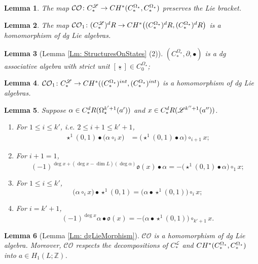 \documentclass[10pt,a4paper]{amsart}
\newtheorem{lemma}{Lemma}
\newcommand{\CBa}{C_*^{\Omega_\star}}
\newcommand{\CC}{\textbf{\textup{CH}}}
\newcommand{\CFr}{C_*^\mathscr{L}}
\newcommand{\CO}{\mathcal{CO}}
\newcommand{\Cba}[1]{C_{#1}^{\Omega_\star}}
\newcommand{\Z}{\mathbb{Z}}
\newcommand{\dR}{\textup{dR}}
\begin{document}
\begin{lemma}\label{Lm: COpreserveLieApp}
	The map $\CO\colon \CFr\to \CC^*(\CBa,\CBa)$ preserves the Lie bracket.
\end{lemma}

\begin{lemma}\label{Lm: OCdR dgLaHomomApp}
	The map $\CO_1\colon (\CFr)^\dR \to \CC^*\big((\CBa)^\dR, (\CBa)^\dR\big)$ is a homomorphism of dg Lie algebras.
\end{lemma}

\begin{lemma}[Lemma \ref{Lm: StructuresOnStates} (2)]\label{Lm: StructuresOnOpenStatesApp}
	$(\CBa, \partial, \bullet)$ is a dg associative algebra with strict unit $[\underline{\star}] \in \Cba{0}$;
\end{lemma}

\begin{lemma}\label{Lm: COint preserves}
	$\CO_1\colon \CFr\to \CC^*((\CBa)^{\textup{int}}, (\CBa)^{\textup{int}})$ is a homomorphism of dg Lie algebras.
\end{lemma}

\begin{lemma}\label{Lm: dRchainStarAnon}
Suppose $\alpha \in C_*^\dR(\Omega_\star^{k'+1}(a'))$ and  $x\in C_*^\dR(\mathscr{L}^{k''+1}(a''))$. 
	\begin{enumerate}
		\item  For $1\leq i \leq k'$, i.e. $2\leq i+1 \leq k'+1$,\begin{align*}
			\star^1(0,1) \bullet\big( \alpha \circ_i x\big) &= \big(\star^1(0,1)\bullet \alpha\big) \circ_{i+1} x;
		\end{align*}
		\item For $i+1=1$, \[ (-1)^{\deg x + ( \deg x - \dim L)(\deg \alpha)} \mathfrak{o}(x) \bullet \alpha =- \big(\star^1(0,1)\bullet \alpha\big) \circ_1 x; \]
		\item For $1\leq i \leq k'$, \[			\big(\alpha \circ_i x\big) \bullet\star^1(0,1) = \big( \alpha \bullet \star^1(0,1)\big) \circ_i x; \]
		\item For $i=k'+1$, \[ (-1)^{\deg x}\alpha \bullet \mathfrak{o}(x) = -\big(\alpha \bullet \star^1(0,1)\big)\circ_{k'+1} x. \]
	\end{enumerate}
\end{lemma}

\begin{lemma}[Lemma \ref{Lm: dgLieMorphism}]\label{Lm: dgLieMorphismApp}
	$\CO$ is a homomorphism of dg Lie algebra.
	Moreover, $\CO$ respects the decompositions of $\CFr$ and $\CC^*(\CBa,\CBa)$ into $a\in H_1(L;\Z)$.
\end{lemma}
\end{document}
